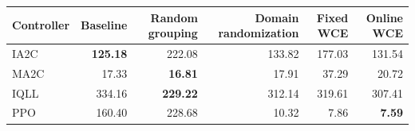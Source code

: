 \begin{tabular}{lrrrrr}
\hline
Controller & Baseline & Random grouping & Domain randomization & Fixed WCE & Online WCE \\
\hline
IA2C & \textbf{125.18} & 222.08 & 133.82 & 177.03 & 131.54 \\
MA2C & 17.33 & \textbf{16.81} & 17.91 & 37.29 & 20.72 \\
IQLL & 334.16 & \textbf{229.22} & 312.14 & 319.61 & 307.41 \\
PPO & 160.40 & 228.68 & 10.32 & 7.86 & \textbf{7.59} \\
\hline
\end{tabular}
